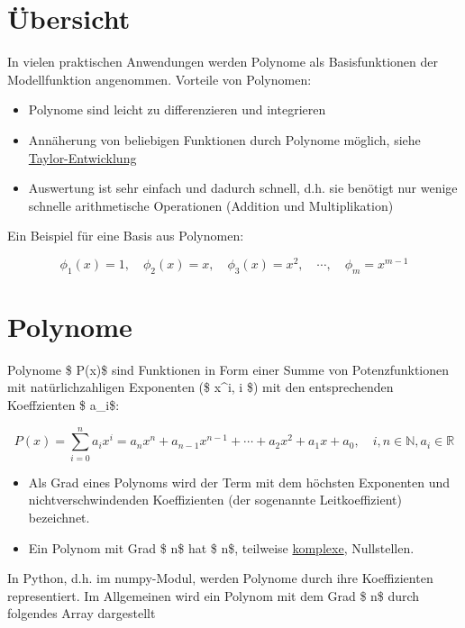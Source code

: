 \documentclass[
  letterpaper,
  DIV=11,
  numbers=noendperiod]{scrreprt}
\providecommand{\tightlist}{%
  \setlength{\itemsep}{0pt}\setlength{\parskip}{0pt}}\usepackage{longtable,booktabs,array}
\begin{document}
\section{Übersicht}\label{uxfcbersicht-1}

In vielen praktischen Anwendungen werden Polynome als Basisfunktionen
der Modellfunktion angenommen. Vorteile von Polynomen:

\begin{itemize}
\tightlist
\item
  Polynome sind leicht zu differenzieren und integrieren
\item
  Annäherung von beliebigen Funktionen durch Polynome möglich, siehe
  \href{https://de.wikipedia.org/wiki/Taylorreihe}{Taylor-Entwicklung}
\item
  Auswertung ist sehr einfach und dadurch schnell, d.h. sie benötigt nur
  wenige schnelle arithmetische Operationen (Addition und
  Multiplikation)
\end{itemize}

Ein Beispiel für eine Basis aus Polynomen:

\[ \phi_1(x)=1,\quad \phi_2(x)=x,\quad \phi_3(x)=x^2,\quad \cdots,\quad \phi_m =x^{m-1} \]

\section{Polynome}\label{polynome}

Polynome \$ P(x)\$ sind Funktionen in Form einer Summe von
Potenzfunktionen mit natürlichzahligen Exponenten (\$ x\^{}i, i
\in {}\$) mit den entsprechenden Koeffzienten \$ a\_i\$:

\[ P(x) = \sum_{i=0}^n a_i x^i = a_n x^n + a_{n-1} x^{n-1} + \cdots + a_2 x^2 + a_1 x + a_0, \quad i, n \in \mathbb{N}, a_i \in \mathbb{R} \]

\begin{itemize}
\tightlist
\item
  Als Grad eines Polynoms wird der Term mit dem höchsten Exponenten und
  nichtverschwindenden Koeffizienten (der sogenannte Leitkoeffizient)
  bezeichnet.
\item
  Ein Polynom mit Grad \$ n\$ hat \$ n\$, teilweise
  \href{https://de.wikipedia.org/wiki/Komplexe_Zahl}{komplexe},
  Nullstellen.
\end{itemize}

In Python, d.h. im numpy-Modul, werden Polynome durch ihre Koeffizienten
representiert. Im Allgemeinen wird ein Polynom mit dem Grad \$ n\$ durch
folgendes Array dargestellt
\end{document}
